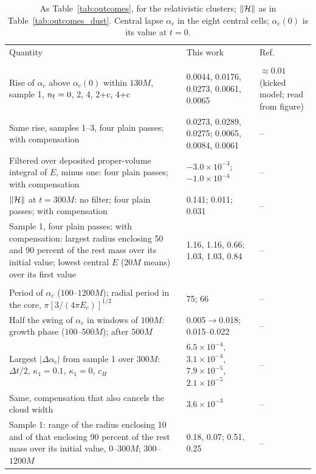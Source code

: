 \begin{table}
\caption{As Table~\ref{tab:outcomes}, for the relativistic clusters; $\|\mathcal{H}\|$ as in Table~\ref{tab:outcomes_dust}. Central lapse $\alpha_c$ in the eight central cells; $\alpha_c(0)$ is its value at $t=0$.}
\label{tab:outcomes_clusters}
\footnotesize
\setlength{\tabcolsep}{3pt}
\begin{ruledtabular}
\begin{tabular}{p{}p{}p{}}
Quantity & This work & Ref.~\cite{Wu:2026nrpic} \tabularnewline
\colrule
\multicolumn{3}{l}{\textit{Stable cluster $y_c=0.819$: filter}} \tabularnewline
\raggedright Rise of $\alpha_c$ above $\alpha_c(0)$ within $130M$, sample 1, $n_{\rm f}=0$, 2, 4, 2+c, 4+c & \raggedright 0.0044, 0.0176, 0.0273, 0.0061, 0.0065 & \raggedright $\approx0.01$ (kicked model; read from figure) \tabularnewline
\raggedright Same rise, samples 1--3, four plain passes; with compensation & \raggedright 0.0273, 0.0289, 0.0275; 0.0065, 0.0084, 0.0061 & \raggedright -- \tabularnewline
\raggedright Filtered over deposited proper-volume integral of $E$, minus one: four plain passes; with compensation & \raggedright $-3.0\times10^{-3}$; $-1.0\times10^{-4}$ & \raggedright -- \tabularnewline
\raggedright $\|\mathcal{H}\|$ at $t=300M$: no filter; four plain passes; with compensation & \raggedright 0.141; 0.011; 0.031 & \raggedright -- \tabularnewline
\raggedright Sample 1, four plain passes; with compensation: largest radius enclosing 50 and 90 percent of the rest mass over its initial value; lowest central $E$ ($20M$ means) over its first value & \raggedright 1.16, 1.16, 0.66; 1.03, 1.03, 0.84 & \raggedright -- \tabularnewline
\colrule
\multicolumn{3}{l}{\textit{Stable cluster $y_c=0.819$: core oscillation}} \tabularnewline
\raggedright Period of $\alpha_c$ ($100$--$1200M$); radial period in the core, $\pi[3/(4\pi E_c)]^{1/2}$ & \raggedright 75; 66 & \raggedright -- \tabularnewline
\raggedright Half the swing of $\alpha_c$ in windows of $100M$: growth phase ($100$--$500M$); after $500M$ & \raggedright 0.005$\to$0.018; 0.015--0.022 & \raggedright -- \tabularnewline
\raggedright Largest $|\Delta\alpha_c|$ from sample 1 over $300M$: $\Delta t/2$, $\kappa_1=0.1$, $\kappa_1=0$, $c_H$ & \raggedright $6.5\times10^{-4}$, $3.1\times10^{-4}$, $7.9\times10^{-5}$, $2.1\times10^{-5}$ & \raggedright -- \tabularnewline
\raggedright Same, compensation that also cancels the cloud width & \raggedright $3.6\times10^{-3}$ & \raggedright -- \tabularnewline
\raggedright Sample 1: range of the radius enclosing 10 and of that enclosing 90 percent of the rest mass over its initial value, $0$--$300M$; $300$--$1200M$ & \raggedright 0.18, 0.07; 0.51, 0.25 & \raggedright -- \tabularnewline

\end{tabular}
\end{ruledtabular}
\end{table}
